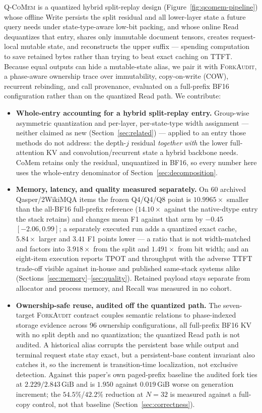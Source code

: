 \documentclass{article}
\newcommand{\qcomem}{\textsc{Q-CoMem}}
\newcommand{\method}{\textsc{ForkAudit}}
\newcommand{\gib}{\,\mathrm{GiB}}
\begin{document}
\qcomem{} is a quantized hybrid split-replay design
(Figure~\ref{fig:qcomem-pipeline}) whose offline Write persists the split
residual and all lower-layer state a future query needs under state-type-aware
low-bit packing, and whose online Read dequantizes that entry, shares only
immutable document tensors, creates request-local mutable state, and
reconstructs the upper suffix --- spending computation to save retained bytes
rather than trying to beat exact caching on TTFT.  Because equal outputs can
hide a mutable-state alias, we pair it with \method{}, a phase-aware ownership
trace over immutability, copy-on-write (COW), recurrent rebinding, and call
provenance, evaluated on a full-prefix BF16 configuration rather than on the
quantized Read path.  We contribute:
\begin{itemize}
  \setlength{\itemsep}{0pt}
  \setlength{\parskip}{0pt}
  \setlength{\topsep}{2pt}
  \setlength{\partopsep}{0pt}
  \item \textbf{Whole-entry accounting for a hybrid split-replay entry.}
Group-wise asymmetric quantization and per-layer, per-state-type width
assignment --- neither claimed as new (Section~\ref{sec:related}) --- applied to
an entry those methods do not address: the depth-$j$ residual \emph{together
with} the lower full-attention KV and convolution/recurrent state a hybrid
backbone needs.  CoMem retains only the residual, unquantized in BF16, so every
number here uses the whole-entry denominator of Section~\ref{sec:decomposition}.
  \item \textbf{Memory, latency, and quality measured separately.} On 60
archived Qasper/2WikiMQA items the frozen Q4/Q4/Q8 point is $10.9965\times$
smaller than the all-BF16 full-prefix reference ($14.10\times$ against the
native-dtype entry the stack retains) and changes mean F1 against that arm by
$-0.45$ $[-2.06,0.99]$; a separately executed run adds a quantized exact cache,
$5.84\times$ larger and $3.41$ F1 points lower --- a ratio that is not
width-matched and factors into $3.918\times$ from the split and $1.491\times$
from bit width; and an eight-item execution reports TPOT and throughput with the
adverse TTFT trade-off visible against in-house and published same-stack systems
alike (Sections~\ref{sec:memory}--\ref{sec:quality}).  Retained payload stays
separate from allocator and process memory, and Recall was measured in no
cohort.
  \item \textbf{Ownership-safe reuse, audited off the quantized path.} The
seven-target \method{} contract couples semantic relations to phase-indexed
storage evidence across 96 ownership configurations, all full-prefix BF16 KV
with no split depth and no quantization; the quantized Read path is not audited.
A historical alias corrupts the persistent base while output and terminal
request state stay exact, but a persistent-base content invariant also catches
it, so the increment is transition-time localization, not exclusive detection.
Against this paper's own paged-prefix baseline the audited fork ties at
$2.229/2.843\gib$ and is $1.950$ against $0.019\gib$ worse on generation
increment; the $54.5\%$/$42.2\%$ reduction at $N=32$ is measured against a
full-copy control, not that baseline (Section~\ref{sec:correctness}).
\end{itemize}
\end{document}
